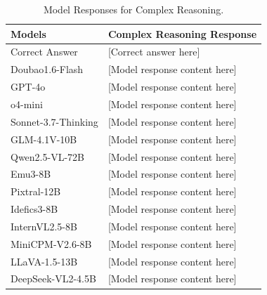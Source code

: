 \begin{table}[h]
\setlength{\tabcolsep}{3mm}
\centering
\small
\begin{tabular}{l|p{12cm}}
\toprule
\textbf{Models} & \textbf{Complex Reasoning Response} \\
\midrule
Correct Answer & [Correct answer here]\\
\midrule
Doubao1.6-Flash & [Model response content here] \\
\midrule
GPT-4o & [Model response content here] \\
\midrule
o4-mini & [Model response content here] \\
\midrule
Sonnet-3.7-Thinking & [Model response content here] \\
\midrule
GLM-4.1V-10B & [Model response content here] \\
\midrule
Qwen2.5-VL-72B & [Model response content here] \\
Emu3-8B & [Model response content here] \\
Pixtral-12B & [Model response content here] \\
Idefics3-8B & [Model response content here] \\
InternVL2.5-8B & [Model response content here] \\
MiniCPM-V2.6-8B & [Model response content here] \\
LLaVA-1.5-13B & [Model response content here] \\
DeepSeek-VL2-4.5B & [Model response content here] \\
\bottomrule
\end{tabular}
\begin{center}
\caption{Model Responses for Complex Reasoning.}
\end{center}
\label{tab:task3_responses}
\end{table}


